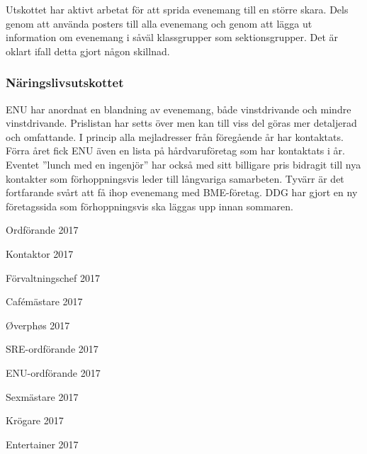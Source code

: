 \documentclass[../_main/handlingar.tex]{subfiles}
\begin{document}
Utskottet har aktivt arbetat för att sprida evenemang till en större skara. Dels genom att använda posters till alla evenemang och genom att lägga ut information om evenemang i såväl klassgrupper som sektionsgrupper. Det är oklart ifall detta gjort någon skillnad.


\subsubsection*{Näringslivsutskottet}
ENU har anordnat en blandning av evenemang, både vinstdrivande och mindre vinstdrivande.  Prislistan har setts över men kan till viss del göras mer detaljerad och omfattande. I princip alla mejladresser från föregående år har kontaktats. Förra året fick ENU även en lista på hårdvaruföretag som har kontaktats i år. Eventet ”lunch med en ingenjör” har också med sitt billigare pris bidragit till nya kontakter som förhoppningsvis leder till långvariga samarbeten. Tyvärr är det fortfarande svårt att få ihop evenemang med BME-företag. DDG har gjort en ny företagssida som förhoppningsvis ska läggas upp innan sommaren.

\newpage
\begin{signatures}{10}
    \mvh
    \signature{Erik Månsson}{Ordförande 2017}
    \signature{Johan Karlberg}{Kontaktor 2017}
    \signature{Sophia Grimmeiss Grahm}{Förvaltningschef 2017}
    \signature{Daniel Bakic}{Cafémästare 2017}
    \signature{Niklas Gustafson}{Øverphøs 2017}
    \signature{Pontus Landgren}{SRE-ordförande 2017}
    \signature{Josefine Sandström}{ENU-ordförande 2017}
    \signature{Linnea Sjödahl}{Sexmästare 2017}
    \signature{Markus Rahne}{Krögare 2017}
    \signature{Albin Nyström Eklund}{Entertainer 2017}
\end{signatures}
\end{document}
